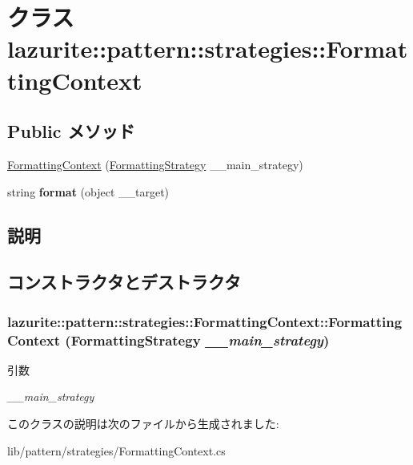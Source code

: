 \hypertarget{classlazurite_1_1pattern_1_1strategies_1_1_formatting_context}{
\section{クラス lazurite::pattern::strategies::FormattingContext}
\label{classlazurite_1_1pattern_1_1strategies_1_1_formatting_context}
}
\subsection*{Public メソッド}
\begin{DoxyCompactItemize}
\item 
\hyperlink{classlazurite_1_1pattern_1_1strategies_1_1_formatting_context_a0054e1cbf70e6eff879fab2b5e7016e9}{FormattingContext} (\hyperlink{classlazurite_1_1pattern_1_1strategies_1_1_formatting_strategy}{FormattingStrategy} \_\-\_\-main\_\-strategy)
\item 
\hypertarget{classlazurite_1_1pattern_1_1strategies_1_1_formatting_context_ae68c7db5cf19c52bea1e739375da5324}{
string {\bfseries format} (object \_\-\_\-target)}
\label{classlazurite_1_1pattern_1_1strategies_1_1_formatting_context_ae68c7db5cf19c52bea1e739375da5324}

\end{DoxyCompactItemize}


\subsection{説明}


\subsection{コンストラクタとデストラクタ}
\hypertarget{classlazurite_1_1pattern_1_1strategies_1_1_formatting_context_a0054e1cbf70e6eff879fab2b5e7016e9}{
\subsubsection[{FormattingContext}]{\setlength{\rightskip}{0pt plus 5cm}lazurite::pattern::strategies::FormattingContext::FormattingContext ({\bf FormattingStrategy} {\em \_\-\_\-main\_\-strategy})}}
\label{classlazurite_1_1pattern_1_1strategies_1_1_formatting_context_a0054e1cbf70e6eff879fab2b5e7016e9}

\begin{DoxyParams}{引数}
\item[{\em \_\-\_\-main\_\-strategy}]\end{DoxyParams}


このクラスの説明は次のファイルから生成されました:\begin{DoxyCompactItemize}
\item 
lib/pattern/strategies/FormattingContext.cs\end{DoxyCompactItemize}
